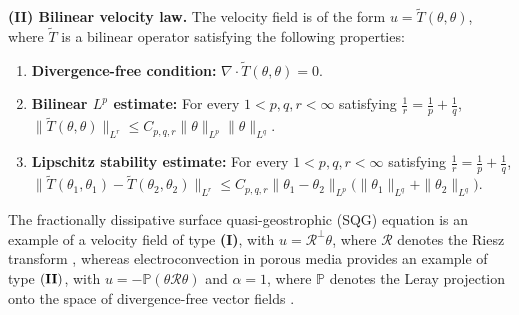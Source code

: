 \documentclass[12pt,reqno]{amsart}
\begin{document}
\noindent\textbf{(II) Bilinear velocity law.}
The velocity field is of the form $u=\tilde T(\theta,\theta)$, where $\tilde T$ is a bilinear operator satisfying the following properties: 

\begin{enumerate}
\item[(i)] \textbf{Divergence-free condition:}
$\nabla\cdot \tilde T(\theta,\theta)=0$.

\item[(ii)] \textbf{Bilinear $L^p$ estimate:}
For every $1<p,q,r<\infty$ satisfying $\frac1r=\frac1p+\frac1q$,
$\|\tilde T(\theta,\theta)\|_{L^r}
\le C_{p,q,r}\|\theta\|_{L^p}\|\theta\|_{L^q}$.

\item[(iii)] \textbf{Lipschitz stability estimate:}
For every $1<p,q,r<\infty$ satisfying $\frac1r=\frac1p+\frac1q$,
$\|\tilde T(\theta_1,\theta_1)-\tilde T(\theta_2,\theta_2)\|_{L^r}
\le C_{p,q,r}\|\theta_1-\theta_2\|_{L^p}
\bigl(\|\theta_1\|_{L^q}+\|\theta_2\|_{L^q}\bigr)$.
\end{enumerate}

The fractionally dissipative surface quasi-geostrophic (SQG) equation is an example of a velocity field of type {\bf{(I)}}, with $u=\mathcal{R}^{\perp}\theta$, where $\mathcal{R}$ denotes the Riesz transform \cite{constantin1999behavior}, whereas electroconvection in porous media provides an example of type ${\bf{(II)}}$, with $u=-\mathbb{P}(\theta \mathcal{R}\theta)$ and $\alpha = 1$, where $\mathbb{P}$ denotes the Leray projection onto the space of divergence-free vector fields \cite{AbdoIgnatova2023}.
\end{document}
